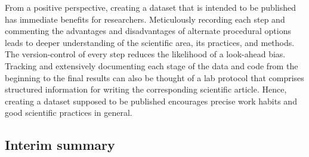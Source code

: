 %
From a positive perspective, creating a dataset that is intended to be published
has immediate benefits for researchers.
%
Meticulously recording each step and commenting the advantages and disadvantages
of alternate procedural options leads to deeper understanding of the scientific
area, its practices, and methods.
%
The version-control of every step reduces the likelihood of a look-ahead bias.
%
Tracking and extensively documenting each stage of the data and code from the
beginning to the final results can also be thought of a lab protocol that
comprises structured information for writing the corresponding scientific
article.
%
Hence, creating a dataset supposed to be published encourages precise work
habits and good scientific practices in general.


\subsection{Interim summary}



